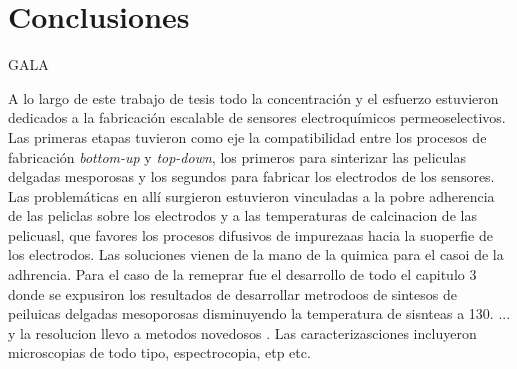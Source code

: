  \newcommand{\NoBiblioConc}[1]{
 \ifthenelse{\equal{#1}{verdadero}}{}{}
 \NoBiblioConc{verdadero}}

 	
 \FormatoCapituloUnaLinea
 
 \chapter{Conclusiones}
 \label{chap:Conclusiones}

 \thispagestyle{empty}
	


 \vfill
 \minitoc
 \newpage

GALA

A lo largo de este trabajo de tesis todo la concentración y el esfuerzo estuvieron dedicados a la fabricación escalable de sensores electroquímicos permeoselectivos. Las primeras etapas tuvieron como eje la compatibilidad entre los procesos de fabricación \textit{bottom-up} y \textit{top-down}, los primeros para sinterizar las peliculas delgadas mesporosas y los segundos para fabricar los electrodos de los sensores. Las problemáticas en allí surgieron estuvieron vinculadas a la pobre adherencia de las peliclas sobre los electrodos y a las temperaturas de calcinacion de las pelicuasl, que favores los procesos difusivos de impurezaas hacia la suoperfie de los electrodos. Las soluciones vienen de la mano de la quimica para el casoi de la adhrencia. Para el caso de la remeprar fue el desarrollo de todo el capitulo 3 donde se expusiron los resultados de desarrollar metrodoos de sintesos de peiluicas delgadas mesoporosas disminuyendo la temperatura de sisnteas a 130.  ... y la resolucion llevo a metodos novedosos . Las caracterizasciones incluyeron microscopias de todo tipo, espectrocopia, etp etc.

